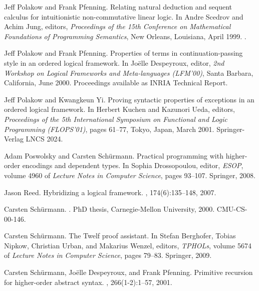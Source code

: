 \documentclass[final]{svjour3}
\begin{document}
\begin{thebibliography}{100}
Jeff Polakow and Frank Pfenning.
\newblock Relating natural deduction and sequent calculus for intuitionistic
  non-commutative linear logic.
\newblock In Andre Scedrov and Achim Jung, editors, {\em Proceedings of the
  15th Conference on Mathematical Foundations of Programming Semantics}, New
  Orleans, Louisiana, April 1999.
.

Jeff Polakow and Frank Pfenning.
\newblock Properties of terms in continuation-passing style in an ordered
  logical framework.
\newblock In Jo{\"e}lle Despeyroux, editor, {\em 2nd Workshop on Logical
  Frameworks and Meta-languages (LFM'00)}, Santa Barbara, California, June
  2000.
\newblock Proceedings available as INRIA Technical Report.

Jeff Polakow and Kwangkeun Yi.
\newblock Proving syntactic properties of exceptions in an ordered logical
  framework.
\newblock In Herbert Kuchen and Kazunori Ueda, editors, {\em Proceedings of the
  5th International Symposium on Functional and Logic Programming (FLOPS'01)},
  pages 61--77, Tokyo, Japan, March 2001. Springer-Verlag LNCS 2024.

Adam Poswolsky and Carsten Sch{\"u}rmann.
\newblock Practical programming with higher-order encodings and dependent
  types.
\newblock In Sophia Drossopoulou, editor, {\em ESOP}, volume 4960 of {\em
  Lecture Notes in Computer Science}, pages 93--107. Springer, 2008.

Jason Reed.
\newblock Hybridizing a logical framework.
, 174(6):135--148, 2007.

Carsten Sch{\"u}rmann.
.
\newblock PhD thesis, Carnegie-Mellon University, 2000.
\newblock CMU-CS-00-146.

Carsten Sch{\"u}rmann.
\newblock The {Twelf} proof assistant.
\newblock In Stefan Berghofer, Tobias Nipkow, Christian Urban, and Makarius
  Wenzel, editors, {\em TPHOLs}, volume 5674 of {\em Lecture Notes in Computer
  Science}, pages 79--83. Springer, 2009.

Carsten Sch{\"u}rmann, Jo{\"e}lle Despeyroux, and Frank Pfenning.
\newblock Primitive recursion for higher-order abstract syntax.
, 266(1-2):1--57, 2001.


\end{thebibliography}
\end{document}

